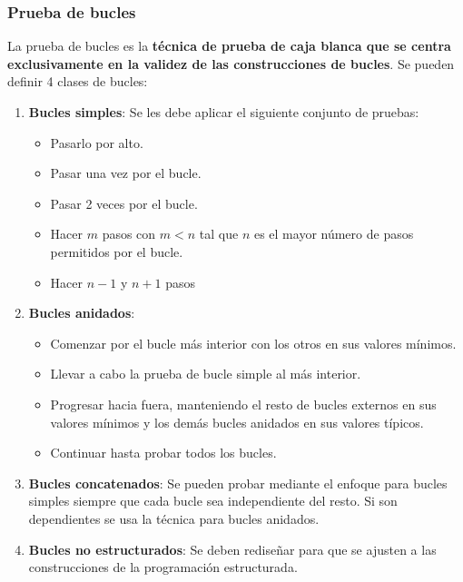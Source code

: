 \subsubsection{Prueba de bucles}
La prueba de bucles es la \textbf{técnica de prueba de caja blanca que se centra exclusivamente en la validez de las construcciones de bucles}. Se pueden definir 4 clases de bucles:
\begin{enumerate}
    \item \textbf{Bucles simples}: Se les debe aplicar el siguiente conjunto de pruebas:
          \begin{itemize}
              \item Pasarlo por alto.
              \item Pasar una vez por el bucle.
              \item Pasar 2 veces por el bucle.
              \item Hacer $m$ pasos con $m < n$ tal que $n$ es el mayor número de pasos permitidos por el bucle.
              \item Hacer $n-1$ y $n+1$ pasos
          \end{itemize}
    \item \textbf{Bucles anidados}:
          \begin{itemize}
              \item Comenzar por el bucle más interior con los otros en sus valores mínimos.
              \item Llevar a cabo la prueba de bucle simple al más interior.
              \item Progresar hacia fuera, manteniendo el resto de bucles externos en sus valores mínimos y los demás bucles anidados en sus valores típicos.
              \item Continuar hasta probar todos los bucles.
          \end{itemize}
    \item \textbf{Bucles concatenados}: Se pueden probar mediante el enfoque para bucles simples siempre que cada bucle sea independiente del resto. Si son dependientes se usa la técnica para bucles anidados.
    \item \textbf{Bucles no estructurados}: Se deben rediseñar para que se ajusten a las construcciones de la programación estructurada.
\end{enumerate}



